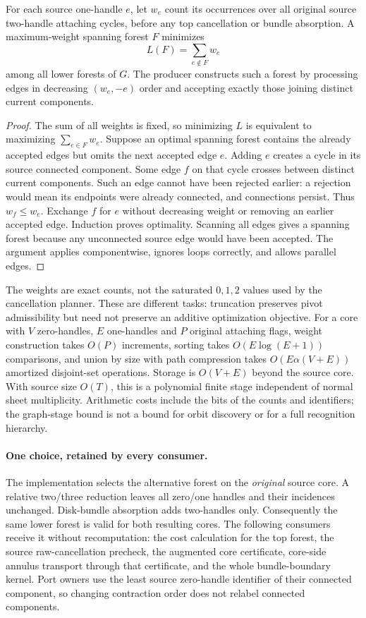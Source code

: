 \begin{proposition}
For each source one-handle $e$, let $w_e$ count its occurrences over all
original source two-handle attaching cycles, before any top cancellation or
bundle absorption. A maximum-weight spanning forest $F$ minimizes
\[
 L(F)=\sum_{e\notin F} w_e
\]
among all lower forests of $G$. The producer constructs such a forest by
processing edges in decreasing $(w_e,-e)$ order and accepting exactly those
joining distinct current components.
\end{proposition}
\begin{proof}
The sum of all weights is fixed, so minimizing $L$ is equivalent to
maximizing $\sum_{e\in F}w_e$. Suppose an optimal spanning forest contains
the already accepted edges but omits the next accepted edge $e$. Adding
$e$ creates a cycle in its source connected component. Some edge $f$ on
that cycle crosses between distinct current components. Such an edge
cannot have been rejected earlier: a rejection would mean its endpoints
were already connected, and connections persist. Thus $w_f\leq w_e$.
Exchange $f$ for $e$ without decreasing weight or removing an earlier
accepted edge. Induction proves optimality. Scanning all edges gives a
spanning forest because any unconnected source edge would have been
accepted. The argument applies componentwise, ignores loops correctly,
and allows parallel edges.
\end{proof}

The weights are exact counts, not the saturated $0,1,2$ values used by the
cancellation planner. These are different tasks: truncation preserves pivot
admissibility but need not preserve an additive optimization objective.
For a core with $V$ zero-handles, $E$ one-handles and $P$ original attaching
flags, weight construction takes $O(P)$ increments, sorting takes
$O(E\log(E+1))$ comparisons, and union by size with path compression takes
$O(E\alpha(V+E))$ amortized disjoint-set operations. Storage is $O(V+E)$
beyond the source core. With source size $O(T)$, this is a polynomial
finite stage independent of normal sheet multiplicity. Arithmetic costs
include the bits of the counts and identifiers; the graph-stage bound is
not a bound for orbit discovery or for a full recognition hierarchy.

\paragraph{One choice, retained by every consumer.}
The implementation selects the alternative forest on the \emph{original}
source core. A relative two/three reduction leaves all zero/one handles
and their incidences unchanged. Disk-bundle absorption adds two-handles
only. Consequently the same lower forest is valid for both resulting
cores. The following consumers receive it without recomputation: the
cost calculation for the top forest, the source raw-cancellation precheck,
the augmented core certificate, core-side annulus transport through that
certificate, and the whole bundle-boundary kernel. Port owners use the
least source zero-handle identifier of their connected component, so
changing contraction order does not relabel connected components.

